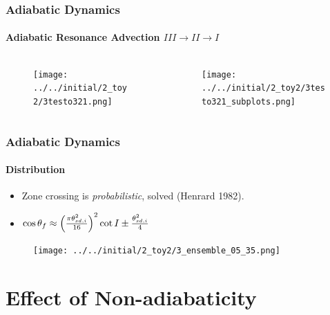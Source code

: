 \documentclass[dvipsnames]{beamer}
\DeclarePairedDelimiter\p{\lparen}{\rparen}
\begin{document}
\begin{frame}
    \frametitle{Adiabatic Dynamics}
    \framesubtitle{Adiabatic Resonance Advection $III \to II \to I$}

    \begin{columns}
        \begin{column}{0.5\textwidth}
            \begin{figure}[t]
                \centering
                \texttt{[image: ../../initial/2\_toy2/3testo321.png]}
            \end{figure}
        \end{column}
        \begin{column}{0.5\textwidth}
            \begin{figure}[t]
                \centering
                \texttt{[image: ../../initial/2\_toy2/3testo321\_subplots.png]}
            \end{figure}
        \end{column}
    \end{columns}
\end{frame}

\begin{frame}
    \frametitle{Adiabatic Dynamics}
    \framesubtitle{Distribution}
    {\small
    \begin{itemize}
        \item Zone crossing is \emph{probabilistic}, solved (Henrard 1982).
        \item $\cos \theta_f \approx \p*{\frac{\pi \theta_{sd,i}^2}{16}}^2 \cot
            I \pm \frac{\theta_{sd,i}^2}{4}$
    \end{itemize}
    }
    \begin{figure}[t]
        \centering
        \texttt{[image: ../../initial/2\_toy2/3\_ensemble\_05\_35.png]}
    \end{figure}
\end{frame}

\section{Effect of Non-adiabaticity}
\end{document}
